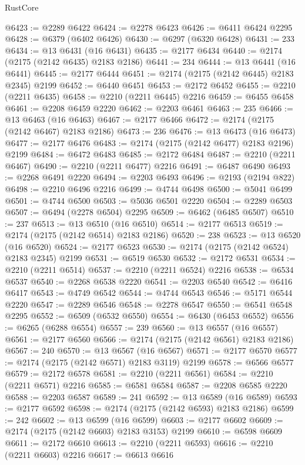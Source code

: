 \begin{lexlean}{RustCore}
\begin{coremodule}
@6423 := @2289 @6422
@6424 := @2278 @6423
@6426 := @6411 @6424 @2295
@6428 := @6379 (@6402 @6426)
@6430 := @6297 (@6320 @6428)
@6431 := 233
@6434 := @13 @6431 (@16 @6431)
@6435 := @2177 @6434
@6440 := @2174 (@2175 (@2142 @6435) @2183 @2186)
@6441 := 234
@6444 := @13 @6441 (@16 @6441)
@6445 := @2177 @6444
@6451 := @2174 (@2175 (@2142 @6445) @2183 @2345) @2199
@6452 := @6440 @6451
@6453 := @2172 @6452
@6455 := @2210 (@2211 @6435)
@6458 := @2210 (@2211 @6445) @2216
@6459 := @6455 @6458
@6461 := @2208 @6459 @2220
@6462 := @2203 @6461
@6463 := 235
@6466 := @13 @6463 (@16 @6463)
@6467 := @2177 @6466
@6472 := @2174 (@2175 (@2142 @6467) @2183 @2186)
@6473 := 236
@6476 := @13 @6473 (@16 @6473)
@6477 := @2177 @6476
@6483 := @2174 (@2175 (@2142 @6477) @2183 @2196) @2199
@6484 := @6472 @6483
@6485 := @2172 @6484
@6487 := @2210 (@2211 @6467)
@6490 := @2210 (@2211 @6477) @2216
@6491 := @6487 @6490
@6493 := @2268 @6491 @2220
@6494 := @2203 @6493
@6496 := @2193 (@2194 @822)
@6498 := @2210 @6496 @2216
@6499 := @4744 @6498
@6500 := @5041 @6499
@6501 := @4744 @6500
@6503 := @5036 @6501 @2220
@6504 := @2289 @6503
@6507 := @6494 (@2278 @6504) @2295
@6509 := @6462 (@6485 @6507)
@6510 := 237
@6513 := @13 @6510 (@16 @6510)
@6514 := @2177 @6513
@6519 := @2174 (@2175 (@2142 @6514) @2183 @2186)
@6520 := 238
@6523 := @13 @6520 (@16 @6520)
@6524 := @2177 @6523
@6530 := @2174 (@2175 (@2142 @6524) @2183 @2345) @2199
@6531 := @6519 @6530
@6532 := @2172 @6531
@6534 := @2210 (@2211 @6514)
@6537 := @2210 (@2211 @6524) @2216
@6538 := @6534 @6537
@6540 := @2268 @6538 @2220
@6541 := @2203 @6540
@6542 := @6416 @6417
@6543 := @4749 @6542
@6544 := @4744 @6543
@6546 := @5171 @6544 @2220
@6547 := @2289 @6546
@6548 := @2278 @6547
@6550 := @6541 @6548 @2295
@6552 := @6509 (@6532 @6550)
@6554 := @6430 (@6453 @6552)
@6556 := @6265 (@6288 @6554)
@6557 := 239
@6560 := @13 @6557 (@16 @6557)
@6561 := @2177 @6560
@6566 := @2174 (@2175 (@2142 @6561) @2183 @2186)
@6567 := 240
@6570 := @13 @6567 (@16 @6567)
@6571 := @2177 @6570
@6577 := @2174 (@2175 (@2142 @6571) @2183 @3119) @2199
@6578 := @6566 @6577
@6579 := @2172 @6578
@6581 := @2210 (@2211 @6561)
@6584 := @2210 (@2211 @6571) @2216
@6585 := @6581 @6584
@6587 := @2208 @6585 @2220
@6588 := @2203 @6587
@6589 := 241
@6592 := @13 @6589 (@16 @6589)
@6593 := @2177 @6592
@6598 := @2174 (@2175 (@2142 @6593) @2183 @2186)
@6599 := 242
@6602 := @13 @6599 (@16 @6599)
@6603 := @2177 @6602
@6609 := @2174 (@2175 (@2142 @6603) @2183 @3153) @2199
@6610 := @6598 @6609
@6611 := @2172 @6610
@6613 := @2210 (@2211 @6593)
@6616 := @2210 (@2211 @6603) @2216
@6617 := @6613 @6616

\end{coremodule}
\end{lexlean}

